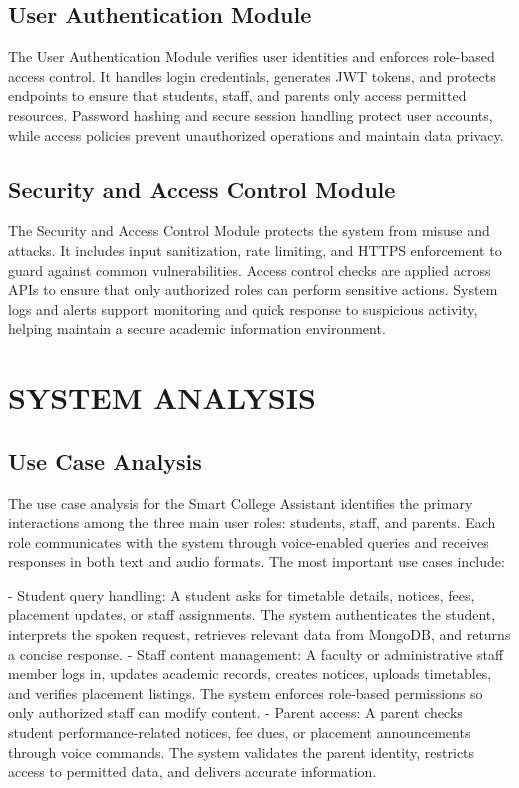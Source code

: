 \documentclass{article}
\begin{document}
\subsection{User Authentication Module}
The User Authentication Module verifies user identities and enforces role-based access control. It handles login credentials, generates JWT tokens, and protects endpoints to ensure that students, staff, and parents only access permitted resources. Password hashing and secure session handling protect user accounts, while access policies prevent unauthorized operations and maintain data privacy.

\subsection{Security and Access Control Module}
The Security and Access Control Module protects the system from misuse and attacks. It includes input sanitization, rate limiting, and HTTPS enforcement to guard against common vulnerabilities. Access control checks are applied across APIs to ensure that only authorized roles can perform sensitive actions. System logs and alerts support monitoring and quick response to suspicious activity, helping maintain a secure academic information environment.

\section{SYSTEM ANALYSIS}

\subsection{Use Case Analysis}
The use case analysis for the Smart College Assistant identifies the primary interactions among the three main user roles: students, staff, and parents. Each role communicates with the system through voice-enabled queries and receives responses in both text and audio formats. The most important use cases include:

- Student query handling: A student asks for timetable details, notices, fees, placement updates, or staff assignments. The system authenticates the student, interprets the spoken request, retrieves relevant data from MongoDB, and returns a concise response.
- Staff content management: A faculty or administrative staff member logs in, updates academic records, creates notices, uploads timetables, and verifies placement listings. The system enforces role-based permissions so only authorized staff can modify content.
- Parent access: A parent checks student performance-related notices, fee dues, or placement announcements through voice commands. The system validates the parent identity, restricts access to permitted data, and delivers accurate information.
\end{document}
